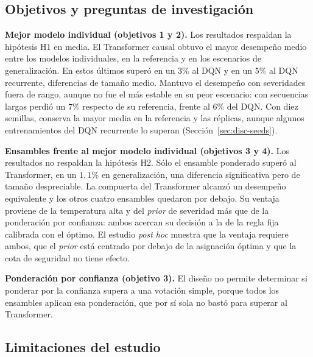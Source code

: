 \documentclass[../00_Main/Main.tex]{subfiles}
\begin{document}
\label{sec:conclusion}

\subsection{Objetivos y preguntas de investigaci\'on}

\textbf{Mejor modelo individual (objetivos 1 y 2).} Los resultados respaldan la hip\'otesis
H1 en media. El Transformer causal obtuvo el mayor desempe\~no medio entre los
modelos individuales, en la referencia y en los escenarios de
generalizaci\'on. En estos \'ultimos super\'o en un $3\%$ al DQN y en un
$5\%$ al DQN recurrente, diferencias de tama\~no medio. Mantuvo el
desempe\~no con severidades fuera de rango, aunque no fue el m\'as estable
en su peor escenario: con secuencias largas perdi\'o un $7\%$ respecto de
su referencia, frente al $6\%$ del DQN. Con diez semillas, conserva la
mayor media en la referencia y las r\'eplicas, aunque algunos
entrenamientos del DQN recurrente lo superan
(Secci\'on~\ref{sec:disc-seeds}).

\textbf{Ensambles frente al mejor modelo individual (objetivos 3 y 4).} Los resultados no
respaldan la hip\'otesis H2. S\'olo el ensamble ponderado super\'o al Transformer,
en un $1{,}1\%$ en generalizaci\'on, una diferencia significativa pero de
tama\~no despreciable. La
compuerta del Transformer alcanz\'o un desempe\~no equivalente y los
otros cuatro ensambles quedaron por debajo. Su ventaja proviene de la temperatura alta y del \emph{prior} de
severidad m\'as que de la ponderaci\'on por confianza: ambos acercan su
decisi\'on a la de la regla fija calibrada con el \'optimo. El estudio \emph{post hoc} muestra que la ventaja requiere ambos, que el
\emph{prior} est\'a centrado por debajo de la asignaci\'on \'optima y que
la cota de seguridad no tiene efecto.

\textbf{Ponderaci\'on por confianza (objetivo 3).} El dise\~no no permite determinar si
ponderar por la confianza supera a una votaci\'on simple, porque todos los
ensambles aplican esa ponderaci\'on, que por s\'i sola no bast\'o para superar al Transformer.

\subsection{Limitaciones del estudio}\label{sec:limitations}
\end{document}
